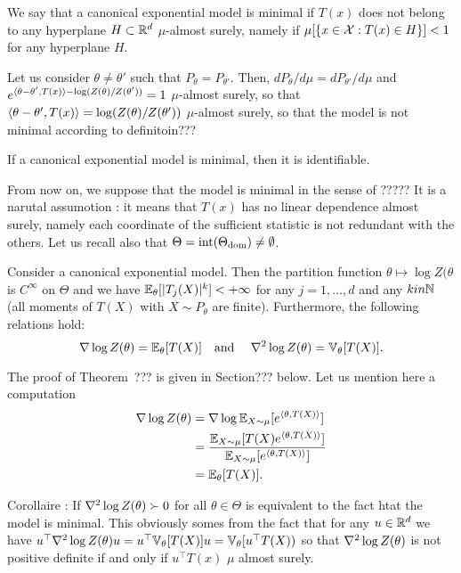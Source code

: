 \begin{definition}
	We say that a canonical exponential model is minimal if $T(x)$ does not belong to any hyperplane $H \subset \mathbb R^d$ $\mu$-almost surely, namely if $\mu[\{ x \in \operatorname{{\mathcal X}} : T(x) \in H \}] < 1$ for any hyperplane $H$.
\end{definition}

Let us consider $\theta \neq \theta'$ such that $P_\theta = P_{\theta'}$. Then, $d P_\theta / d \mu =d P_{\theta'} / d \mu $ and $e^{\langle \theta - \theta', T(x) \rangle - \log (Z(\theta) / Z(\theta'))} = 1$ $\mu$-almost surely, so that $\langle \theta - \theta', T(x) \rangle = \log (Z(\theta) / Z(\theta'))$ $\mu$-almost surely, so that the model is not minimal according to definitoin???
\begin{proposition}
	If a canonical exponential model is minimal, then it is identifiable.
\end{proposition}
From now on, we suppose that the model is minimal in the sense of ?????
It is a narutal assumotion : it means that $T(x)$ has no linear dependence almost surely, namely each coordinate of the sufficient statistic is not redundant with the others.
Let us recall also that $\Theta = \operatorname{int}(\Theta_{\operatorname{dom}}) \neq \emptyset$.

\begin{theorem}
	Consider a canonical exponential model. Then the partition function $\theta \mapsto \log Z(\theta$ is $C^\infty$ on $\Theta$ and we have $\mathbb E_\theta[ |T_j(X)|^k ] < +\infty$ for any $j=1, \ldots, d$ and any $k in \mathbb N$ (all moments of $T(X)$ with $X \sim P_\theta$ are finite). Furthermore, the following relations hold:
	\begin{equation*}
		\grad \log Z(\theta) = \E_\theta[T(X)] \quad \text{and} \quad \grad^2 \log Z(\theta) = \var_\theta[T(X)].
	\end{equation*}
\end{theorem}

The proof of Theorem~??? is given in Section??? below. Let us mention here a computation 
\begin{align*}
	\nabla \log Z(\theta) &= \nabla \log \mathbb E_{X \sim \mu} [e^{\langle \theta, T(X) \rangle}] \\
	&= \frac{\mathbb E_{X \sim \mu} [T(X) e^{\langle \theta, T(X) \rangle}]}{\mathbb E_{X \sim \mu} [e^{\langle \theta, T(X) \rangle}]} \\
	&= \mathbb E_{\theta} [T(X)].
\end{align*}

Corollaire : If $\nabla^2 \log Z(\theta) \succ 0$ for all $\theta \in \Theta$ is equivalent to the fact htat the model is minimal.
This obviously somes from the fact that for any $u \in \mathbb R^d$ we have $u^\top \nabla^2 \log Z(\theta)  u = u^\top \mathbb V_\theta[T(X)] u = \mathbb V_\theta[u^\top T(X))$ so that $\nabla^2 \log Z(\theta)$ is not positive definite if and only if $u^\top T(x)$ $\mu$ almost surely.

